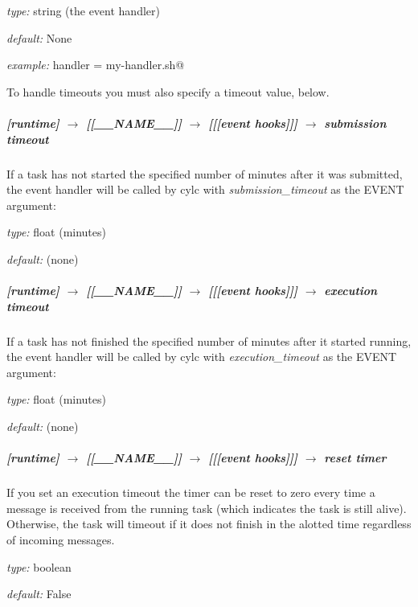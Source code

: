 \begin{myitemize}
    \item {\em type:} string (the event handler)
    \item {\em default:} None
    \item {\em example:} \lstinline@failed handler = my-handler.sh@
\end{myitemize}

To handle timeouts you must also specify a timeout value, below.

\subparagraph[submission timeout]{[runtime] $\rightarrow$ [[\_\_NAME\_\_]] $\rightarrow$ [[[event hooks]]] $\rightarrow$ submission timeout}

If a task has not started the specified number of minutes after it was
submitted, the event handler will be called by cylc with 
{\em submission\_timeout} as the EVENT argument:
\begin{myitemize}
    \item {\em type:} float (minutes)
    \item {\em default:} (none)
\end{myitemize}

\subparagraph[execution timeout]{[runtime] $\rightarrow$ [[\_\_NAME\_\_]] $\rightarrow$ [[[event hooks]]] $\rightarrow$ execution timeout}

If a task has not finished the specified number of minutes after it
started running, the event handler will be called by cylc with {\em
execution\_timeout} as the EVENT argument:
\begin{myitemize}
    \item {\em type:} float (minutes)
    \item {\em default:} (none)
\end{myitemize}

\subparagraph[reset timer]{[runtime] $\rightarrow$ [[\_\_NAME\_\_]] $\rightarrow$ [[[event hooks]]] $\rightarrow$ reset timer}

If you set an execution timeout the timer can be reset to zero every
time a message is received from the running task (which indicates the 
task is still alive).  Otherwise, the task will timeout if it does not
finish in the alotted time regardless of incoming messages.

\begin{myitemize}
\item {\em type:} boolean
\item {\em default:} False
\end{myitemize}

